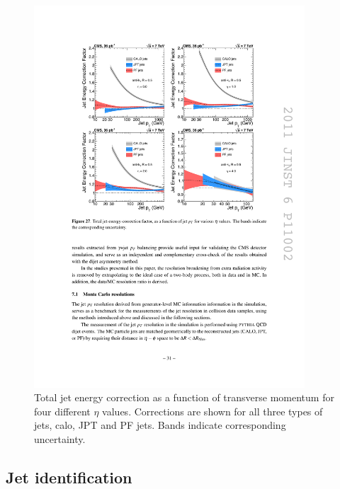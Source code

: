 \begin{figure}[htbp]
	\centering
		\includegraphics[width=0.9\textwidth]{Figures/jet_tot_corr_pt.pdf}
	\caption[Total jet energy correction as a function of transverse momentum for four different $\eta$ values.]{Total jet energy correction as a function of transverse momentum for four different $\eta$ values. Corrections are shown for all three types of jets, calo, JPT and PF jets. Bands indicate corresponding uncertainty.}
	\label{fig:tot_corr_pt}
\end{figure}

\subsection{Jet identification}

